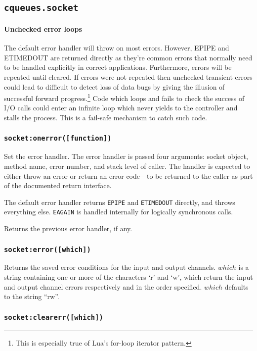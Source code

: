 \documentclass[11pt, oneside]{memoir}
\newcommand*{\fn}[1]{\texttt{#1}\xspace}
\newcommand*{\errno}[1]{\texttt{#1}\xspace}
\newcounter{toccols}
\newenvironment{Module}[1]{
	\subsection{\texttt{#1}}
	\addtocontents{toc}{
		\protect\begin{multicols}{\value{toccols}}
	}
}{
	\addtocontents{toc}{\protect\end{multicols}}
}
\begin{document}
\begin{Module}{cqueues.socket}
\paragraph{Unchecked error loops} The default error handler will throw on most errors. However, EPIPE and ETIMEDOUT are returned directly as they're common errors that normally need to be handled explicitly in correct applications. Furthermore, errors will be repeated until cleared. If errors were not repeated then unchecked transient errors could lead to difficult to detect loss of data bugs by giving the illusion of successful forward progress.\footnote{This is especially true of Lua's for-loop iterator pattern.} Code which loops and fails to check the success of I/O calls could enter an infinite loop which never yields to the controller and stalls the process. This is a fail-safe mechanism to catch such code.

\subsubsection[\fn{socket:onerror}]{\fn{socket:onerror([function])}}
Set the error handler. The error handler is passed four arguments: socket object, method name, error number, and stack level of caller. The handler is expected to either throw an error or return an error code---to be returned to the caller as part of the documented return interface.

The default error handler returns \errno{EPIPE} and \errno{ETIMEDOUT} directly, and throws everything else. \errno{EAGAIN} is handled internally for logically synchronous calls.

Returns the previous error handler, if any.

\subsubsection[\fn{socket:error}]{\fn{socket:error([which])}}

Returns the saved error conditions for the input and output channels. $which$ is a string containing one or more of the characters `r' and `w', which return the input and output channel errors respectively and in the order specified. $which$ defaults to the string ``rw''.

\subsubsection[\fn{socket:clearerr}]{\fn{socket:clearerr([which])}}


\end{Module}
\end{document}
